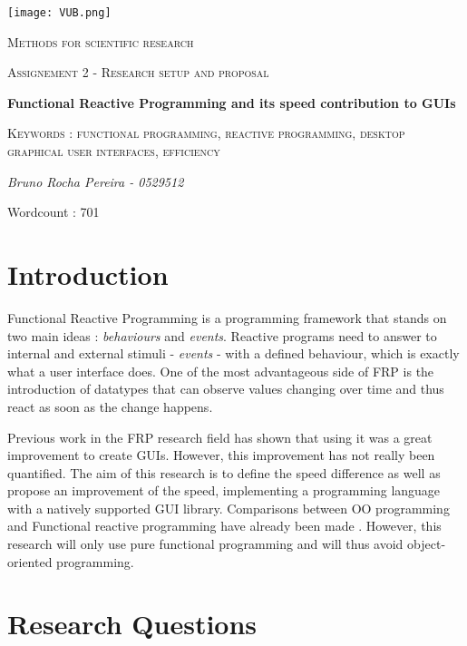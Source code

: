 \documentclass[12pt,a4paper]{scrartcl}
\begin{document}
\begin{titlepage}
    \centering
    \texttt{[image: VUB.png]}\par\vspace{1cm}
    {\scshape\Large Methods for scientific research\par}
    \vspace{1cm}
    {\scshape\Large Assignement 2 - Research setup and proposal\par}
    \vspace{1.5cm}
    {\huge\bfseries Functional Reactive Programming and its speed contribution to GUIs\par}
    \vspace{1cm}
    {\scshape Keywords : functional programming, reactive programming, desktop graphical user interfaces, efficiency \par}
    \vspace{1cm}
    {\Large\itshape Bruno Rocha Pereira - 0529512\par}
    \vspace{1.5cm}
    {Wordcount : 701}
    \vfill
\end{titlepage}

\section{Introduction}
Functional Reactive Programming is a programming framework that stands on two main ideas : \textit{behaviours} and \textit{events}. Reactive programs need to answer to internal and external stimuli - \textit{events} - with a defined behaviour, which is exactly what a user interface does. \cite{wan2000functional} One of the most advantageous side of FRP is the introduction of datatypes that can observe values changing over time and thus react as soon as the change happens.\cite{kraeutmann2015functional}

Previous work in the FRP research field has shown that using it was a great improvement to create GUIs. However, this improvement has not really been quantified. The aim of this research is to define the speed difference as well as propose an improvement of the speed, implementing a programming language with a natively supported GUI library. Comparisons between OO programming and Functional reactive programming have already been made \cite{salvaneschi2014empirical}. However, this research will only use pure functional programming and will thus avoid object-oriented programming.

\section{Research Questions}
\end{document}
